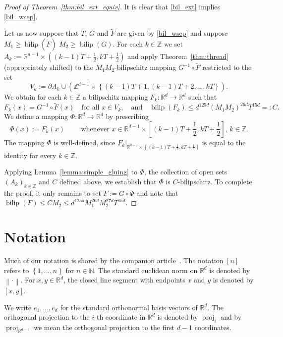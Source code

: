 \documentclass[a4paper, bibliography=totoc]{scrartcl}
\numberwithin{claimcounter}{define}
\newcommand{\R}{\mathbb{R}}
\newcommand{\Z}{\mathbb{Z}}
\newcommand{\N}{\mathbb{N}}
\newcommand{\rest}[2]{#1|_{#2}} %
\newcommand{\bilip}{\operatorname{bilip}}
\DeclareMathOperator{\proj}{proj}
\newcommand{\norm}[1]{\left\|#1\right\|}
\newcommand{\set}[1]{\left\{#1\right\}}
\newcommand{\br}[1]{\left(#1\right)}
\newcommand{\sqbr}[1]{\left[#1\right]}
\newcommand{\wt}[1]{\widetilde{#1}}
\begin{document}
\begin{proof}[Proof of Theorem~\ref{thm:bil_ext_equiv}]
	It is clear that \eqref{bil_ext} implies \eqref{bil_wsep}.
	
	Let us now suppose that $T$, $G$ and $\wt{F}$ are given by \eqref{bil_wsep} and suppose $M_{1}\geq \bilip(\wt{F})$ $M_{2}\geq \bilip(G)$. For each $k\in\Z$ we set $A_k:=\R^{d-1}\times\br{(k-1)T+\frac{1}{2},kT+\frac{1}{2}}$ and apply Theorem~\ref{thm:thread} (appropriately shifted) to the $M_{1}M_{2}$-bilipschitz mapping $G^{-1}\circ \wt{F}$ restricted to the set
	\begin{equation*}
	V_{k}:=\partial A_k\cup\br{\Z^{d-1}\times \set{(k-1)T+1,(k-1)T+2,\ldots,kT}}.
	\end{equation*}
	We obtain for each $k\in\Z$ a bilipschitz mapping $F_{k}\colon\R^d\to \R^{d}$ such that 
	\begin{equation*}
	F_{k}(x)=G^{-1}\circ \wt{F}(x) \quad \text{for all }x\in V_{k},
	\quad\text{and}\quad
	\bilip(F_{k})\leq d^{125d}\br{M_{1}M_{2}}^{26d}T^{15d}=:C.
	\end{equation*}
	We define a mapping $\Phi\colon\R^d\to\R^d$ by prescribing
	\[
	\Phi(x):=F_k(x)\qquad\text{ whenever } x\in \R^{d-1}\times\sqbr{(k-1)T+\frac{1}{2},kT+\frac{1}{2}},\,k\in\Z.
	\]
	The mapping $\Phi$ is well-defined, since $\rest{F_k}{\R^{d-1}\times\set{(k-1)T+\frac{1}{2},kT+\frac{1}{2}}}$ is equal to the identity for every $k\in\Z$.
	
	Applying Lemma~\ref{lemma:simple_gluing} to $\Phi$, the collection of open sets $\br{A_k}_{k\in\Z}$ and $C$ defined above, we establish that $\Phi$ is $C$-bilipschitz. To complete the proof, it only remains to set $F:=G\circ \Phi$ and note that $\bilip(F)\leq CM_{2}\leq d^{125d}M_{1}^{26d}M_{2}^{27d}T^{15d}$.
\end{proof}

\section{Notation}
Much of our notation is shared by the companion article~\cite{DK_2dim}. The notation $[n]$ refers to $\set{1,\ldots, n}$ for $n\in\N$. The standard euclidean norm on $\R^d$ is denoted by $\norm{\cdot}$. 
For $x,y\in\R^d$, the closed line segment with endpoints $x$ and $y$ is denoted by $[x,y]$.

We write $e_1, \ldots, e_d$ for the standard orthonormal basis vectors of $\R^d$. The orthogonal projection to the $i$-th coordinate in $\R^d$ is denoted by $\proj_i$ and by $\proj_{\R^{d-1}}$ we mean the orthogonal projection to the first $d-1$ coordinates.
\end{document}
